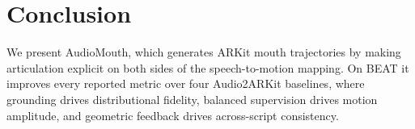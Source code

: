 \vspace{-2mm}
\section{Conclusion}
\label{sec:conclusion}
\vspace{-1mm}

We present AudioMouth, which generates ARKit mouth trajectories by making articulation explicit on both sides of the speech-to-motion mapping. On BEAT it improves every reported metric over four Audio2ARKit baselines, where grounding drives distributional fidelity, balanced supervision drives motion amplitude, and geometric feedback drives across-script consistency.
